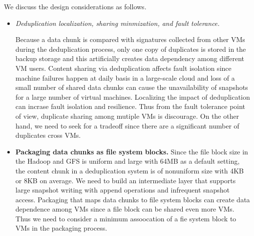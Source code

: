 We discuss the design considerations as follows. 
\begin{itemize}
\item {\em Deduplication localization, sharing minmization, and fault tolerance.}

Because a data chunk is compared with signatures collected from other VMs during
the deduplication process, only one copy of duplicates is stored in the backup storage
and this artificially creates data dependency among different VM users. 
Content sharing via deduplication affects fault isolation since machine failures happen at daily 
basis in a large-scale cloud and
loss of a small number of shared data chunks can 
cause the unavailability of snapshots for a large number of virtual machines.
Localizing the impact of deduplication can incrase fault isolation and resilience.
Thus from the fault tolerance point of view,  duplicate sharing among mutiple VMs is 
discourage. On the other hand, we need to seek for a tradeoff since there are
a significant number of duplicates cross VMs.
 
\item{\bf Packaging  data chunks as file system blocks.}
Since the file block size in the Hadoop and GFS is uniform and large with 64MB as a default setting,
the content chunk in a deduplication system is of nonuniform size with 4KB or 8KB on average.
We need to build an intermediate layer that supports large snapshot writing with append operations
and infrequent snapshot access.
Packaging that maps data chunks to file system blocks can create data dependence among VMs
since a file block can be shared even more VMs.
Thus we need to consider a minimum assoocation of a fie system block to VMs in the packaging process.
\end{itemize}

